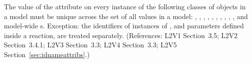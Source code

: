 The value of the  attribute on every instance of the
following classes of objects in a model must be unique
across the set of all  values in a model: \Model,
\FunctionDefinition, \CompartmentType, \SpeciesType,
\Compartment, \Species, \Reaction, \SpeciesReference,
\ModifierSpeciesReference, \Event, and model-wide \Parameter{}s.
Exception: the identifiers of instances of \UnitDefinition, and parameters defined
inside a reaction, are treated separately.  (References: L2V1
Section~3.5; L2V2 Section~3.4.1; L2V3 Section~3.3; L2V4 Section~3.3; L2V5 
Section~\ref{sec:idnameattribs}.)
